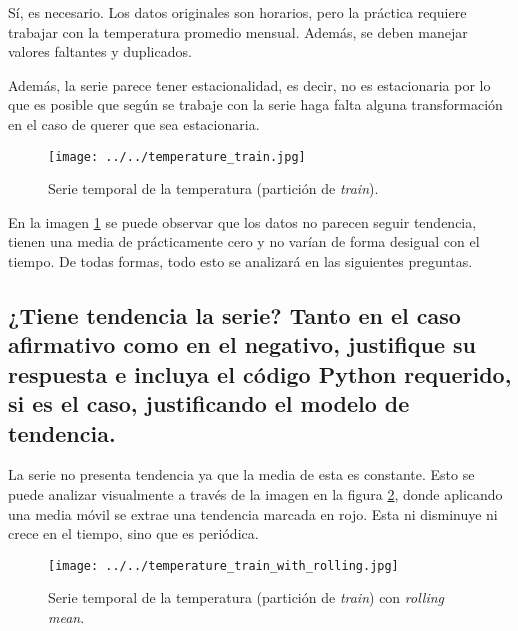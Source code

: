 \documentclass[12pt,letterpaper]{article}
\begin{document}
Sí, es necesario. Los datos originales son horarios, pero la práctica requiere trabajar con la temperatura promedio mensual. Además, se deben manejar valores faltantes y duplicados.

Además, la serie parece tener estacionalidad, es decir, no es estacionaria por lo que es posible que según se trabaje con la serie haga falta alguna transformación en el caso de querer que sea estacionaria.

\begin{figure}[htp]
    \centering
    \texttt{[image: ../../temperature\_train.jpg]}
    \caption{Serie temporal de la temperatura (partición de \textit{train}).}
    \label{fig:temperature_ts}
\end{figure}

En la imagen \ref{fig:temperature_ts} se puede observar que los datos no parecen seguir tendencia, tienen una media de prácticamente cero y no varían de forma desigual con el tiempo. De todas formas, todo esto se analizará en las siguientes preguntas.

\subsection{¿Tiene tendencia la serie? Tanto en el caso afirmativo como en el negativo,
    justifique su respuesta e incluya el código Python requerido, si es el caso,
    justificando el modelo de tendencia.}

La serie no presenta tendencia ya que la media de esta es constante. Esto se puede analizar visualmente a través de la imagen en la figura \ref{fig:temperature_ts_rolling}, donde aplicando una media móvil se extrae una tendencia marcada en rojo. Esta ni disminuye ni crece en el tiempo, sino que es periódica.

\begin{figure}[htp]
    \centering
    \texttt{[image: ../../temperature\_train\_with\_rolling.jpg]}
    \caption{Serie temporal de la temperatura (partición de \textit{train}) con \textit{rolling mean}.}
    \label{fig:temperature_ts_rolling}
\end{figure}
\end{document}
